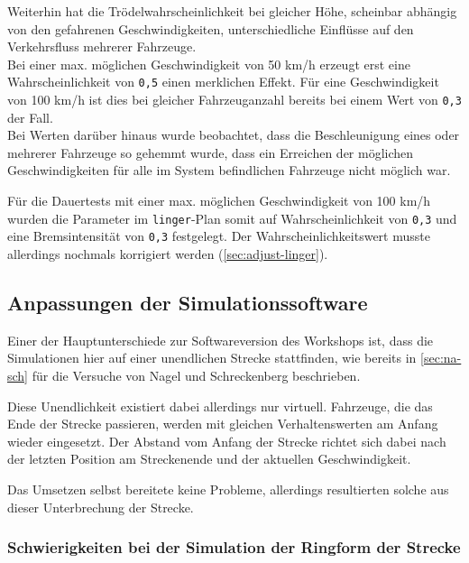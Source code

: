 Weiterhin hat die Trödelwahrscheinlichkeit bei gleicher Höhe, scheinbar abhängig von den gefahrenen Geschwindigkeiten, unterschiedliche Einflüsse auf den Verkehrsfluss mehrerer Fahrzeuge.
\\
Bei einer max. möglichen Geschwindigkeit von 50 km/h erzeugt erst eine Wahrscheinlichkeit von \texttt{0,5} einen merklichen Effekt. Für eine Geschwindigkeit von 100 km/h ist dies bei gleicher Fahrzeuganzahl bereits bei einem Wert von \texttt{0,3} der Fall.
\\
Bei Werten darüber hinaus wurde beobachtet, dass die Beschleunigung eines oder mehrerer Fahrzeuge so gehemmt wurde, dass ein Erreichen der möglichen Geschwindigkeiten für alle im System befindlichen Fahrzeuge nicht möglich war.

Für die Dauertests mit einer max. möglichen Geschwindigkeit von 100 km/h wurden die Parameter im \texttt{linger}-Plan somit auf Wahrscheinlichkeit von \texttt{0,3} und eine Bremsintensität von \texttt{0,3} festgelegt.
Der Wahrscheinlichkeitswert musste allerdings nochmals korrigiert werden (\cref{sec:adjust-linger}).






\subsection{Anpassungen der Simulationssoftware}
\label{sec:anpassungen-probleme}

Einer der Hauptunterschiede zur Softwareversion des Workshops ist, dass die Simulationen hier auf einer unendlichen Strecke stattfinden, wie bereits in \cref{sec:na-sch} für die Versuche von Nagel und Schreckenberg beschrieben.

Diese Unendlichkeit existiert dabei allerdings nur virtuell.
Fahrzeuge, die das Ende der Strecke passieren, werden mit gleichen Verhaltenswerten am Anfang wieder eingesetzt.
Der Abstand vom Anfang der Strecke richtet sich dabei nach der letzten Position am Streckenende und der aktuellen Geschwindigkeit.

Das Umsetzen selbst bereitete keine Probleme, allerdings resultierten solche aus dieser Unterbrechung der Strecke.



\subsubsection{Schwierigkeiten bei der Simulation der Ringform der Strecke}
\label{sec:probleme-ringform}

